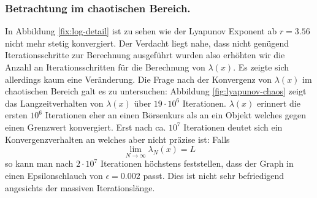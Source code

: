\documentclass[11,5pt, twoside]{article}
\begin{document}
\subsubsection{Betrachtung im chaotischen Bereich.}
In Abbildung \ref{fix:log-detail} ist zu sehen wie der Lyapunov Exponent ab $r=3.56$ nicht mehr stetig konvergiert. 
Der Verdacht liegt nahe, dass nicht genügend Iterationsschritte zur Berechnung ausgeführt wurden also erhöhten wir die Anzahl an Iterationsschritten für die Berechnung von $\lambda(x)$. Es zeigte sich allerdings kaum eine Veränderung. Die Frage nach der Konvergenz von $\lambda(x)$ im chaotischen Bereich galt es zu untersuchen: Abbildung \ref{fig:lyapunov-chaos} zeigt das Langzeitverhalten von $\lambda(x)$ über $19\cdot10^6$ Iterationen. $\lambda(x)$ erinnert die ersten $10^6$ Iterationen eher an einen Börsenkurs als an ein Objekt welches gegen einen Grenzwert konvergiert. Erst nach ca. $10^7$ Iterationen deutet sich ein Konvergenzverhalten an welches aber nicht präzise ist: Falls 
\begin{equation}
\lim_{N \rightarrow \infty} \lambda_N(x) = L
\end{equation}
so kann man nach $2\cdot10^7$ Iterationen höchstens feststellen, dass der Graph in einen Epsilonschlauch von $\epsilon=0.002$ passt. Dies ist nicht sehr befriedigend angesichts der massiven Iterationslänge.
\end{document}
